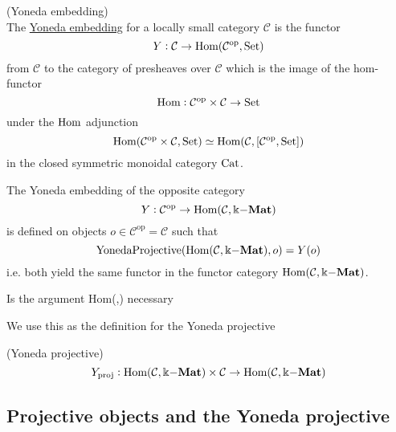 \begin{definition}{(Yoneda embedding)}\label{def:yoneda_embedding}\\
The \ul{Yoneda embedding} for a locally small category $\mathcal{C}$ is the functor
\[
Y : \mathcal{C} \rightarrow \textup{Hom}(\mathcal{C}^{\text{op}}, \textup{Set})
\]
from $\mathcal{C}$ to the category of presheaves over $\mathcal{C}$ which is the image of the hom-functor
\[
\textup{Hom} : \mathcal{C}^{\text{op}}\times\mathcal{C} \rightarrow \textup{Set}
\]
under the $\textup{Hom}$ adjunction
\[
\textup{Hom}(\mathcal{C}^{\text{op}}\times\mathcal{C}, \textup{Set}) \simeq \textup{Hom}(\mathcal{C},[\mathcal{C}^{\text{op}}, \textup{Set}])
\]
in the closed symmetric monoidal category $\textup{Cat}$.
\end{definition}

\begin{remark}
The Yoneda embedding of the opposite category
\[
Y : \mathcal{C}^{\text{op}} \rightarrow \textup{Hom}(\mathcal{C}, \Bbbk\mathbf{-Mat})
\]
is defined on objects $o \in \mathcal{C}^{\text{op}} = \mathcal{C}$ such that
\[
\textup{YonedaProjective}(\textup{Hom}( \mathcal{C}, \Bbbk\mathbf{-Mat} ), o ) = Y(o)
\]
i.e. both yield the same functor in the functor category $\textup{Hom}(\mathcal{C},\Bbbk\mathbf{-Mat})$.
\end{remark}

Is the argument \textup{Hom}(,\Bbbk{}) necessary

We use this as the definition for the Yoneda projective

\begin{definition}{(Yoneda projective)}
\[
Y_{\text{proj}} : \textup{Hom}(\mathcal{C},\Bbbk\mathbf{-Mat})\times \mathcal{C} \rightarrow \textup{Hom}(\mathcal{C},\Bbbk\mathbf{-Mat})
\]
\end{definition}

\subsection{Projective objects and the Yoneda projective}

